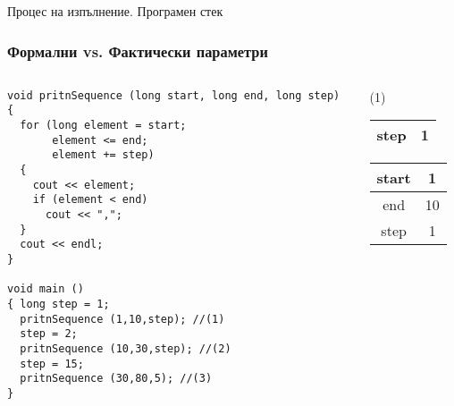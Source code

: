 \documentclass{beamer}
\begin{document}
\begin{frame}
\centerline{Процес на изпълнение. Програмен стек}
\end{frame}


\begin{frame}[fragile]
\frametitle{Формални vs. Фактически параметри}



\begin{columns}[t]
  \begin{column}{0.75\textwidth}

\begin{lstlisting}
void pritnSequence (long start, long end, long step)
{
  for (long element = start; 
       element <= end;  
       element += step)
  {
    cout << element;
    if (element < end)
      cout << ",";
  }  
  cout << endl;
}

void main ()
{ long step = 1;
  pritnSequence (1,10,step); //(1)
  step = 2;
  pritnSequence (10,30,step); //(2)
  step = 15;
  pritnSequence (30,80,5); //(3)
}
\end{lstlisting}


  \end{column}
  \begin{column}{0.25\textwidth}

    \alert{(1)}

    \begin{tabular}{|c|c|}
    step & 1 \\\hline

    \end{tabular}
    \pause
    \begin{tabular}{|c|c|}
    start & 1 \\\hline
    end & 10 \\\hline
    step & 1 \\\hline

    \end{tabular}
  \end{column}
\end{columns}

\end{frame}
\end{document}
